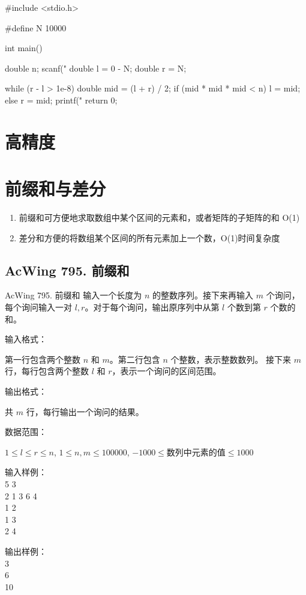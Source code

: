 \begin{mycpptwocol}[数的三次方根]
#include <stdio.h>

#define N 10000

int main()
{
    double n;
    scanf("%
    double l = 0 - N;
    double r = N;

    while (r - l > 1e-8) {
        double mid = (l + r) / 2;
        if (mid * mid * mid < n) {
            l = mid;
        } else {
            r = mid;
        }
    }
    printf("%
    return 0;
}
\end{mycpptwocol}

\section{高精度}

\section{前缀和与差分}
\begin{enumerate}
    \item 前缀和可方便地求取数组中某个区间的元素和，或者矩阵的子矩阵的和 O(1)
    \item 差分和方便的将数组某个区间的所有元素加上一个数，O(1)时间复杂度
\end{enumerate}

\subsection{AcWing 795. 前缀和}
\begin{titledbox}{AcWing 795. 前缀和}
    输入一个长度为 $n$ 的整数序列。接下来再输入 $m$ 个询问，每个询问输入一对 $l, r$。对于每个询问，输出原序列中从第 $l$ 个数到第 $r$ 个数的和。
    
    输入格式：

    第一行包含两个整数 $n$ 和 $m$。第二行包含 $n$ 个整数，表示整数数列。
    接下来 $m$ 行，每行包含两个整数 $l$ 和 $r$，表示一个询问的区间范围。
    
    输出格式：

    共 $m$ 行，每行输出一个询问的结果。

    数据范围：

    $1 \le l \le r \le n$, $1 \le n,m \le 100000$, $-1000 \le \text{数列中元素的值} \le 1000$
    
    \begin{minipage}[t]{.5\textwidth}
        输入样例：\\
        5 3 \\
        2 1 3 6 4 \\
        1 2 \\
        1 3 \\
        2 4
        \end{minipage}%
        \begin{minipage}[t]{.5\textwidth}
        输出样例：\\
        3 \\
        6 \\
        10
    \end{minipage}
\end{titledbox}

